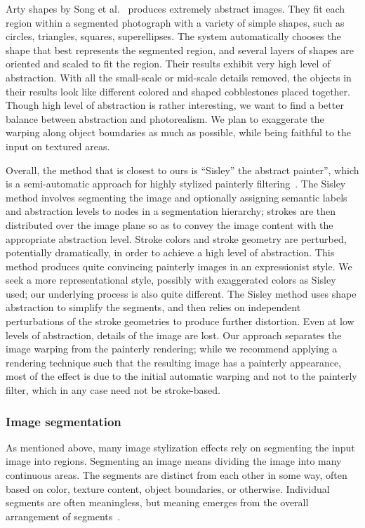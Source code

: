 Arty shapes by Song et al.~\cite{artyshapes} produces extremely abstract images. They fit each region within a segmented photograph with a variety of simple shapes, such as circles, triangles, squares, superellipses. The system automatically chooses the shape that best represents the segmented region, and several layers of shapes are oriented and scaled to fit the region. Their results exhibit very high level of abstraction. With all the small-scale or mid-scale details removed, the objects in their results look like different colored and shaped cobblestones placed together. Though high level of abstraction is rather interesting, we want to find a better balance between abstraction and photorealism. We plan to exaggerate the warping along object boundaries as much as possible, while being faithful to the input on textured areas. 

Overall, the method that is closest to ours is ``Sisley'' the abstract painter”, which is a semi-automatic approach for highly stylized painterly filtering~\cite{sisley}. The Sisley method involves segmenting the image and optionally assigning semantic labels and abstraction levels to nodes in a segmentation hierarchy; strokes are then distributed over the image plane so as to convey the image content with the appropriate abstraction level. Stroke colors and stroke geometry are perturbed, potentially dramatically, in order to achieve a high level of abstraction. This method produces quite convincing painterly images in an expressionist style. We seek a more representational style, possibly with exaggerated colors as Sisley used; our underlying process is also quite different. The Sisley method uses shape abstraction to simplify the segments, and then relies on independent perturbations of the stroke geometries to produce further distortion. Even at low levels of abstraction, details of the image are lost. Our approach separates the image warping from the painterly rendering; while we recommend applying a rendering technique such that the resulting image has a painterly appearance, most of the effect is due to the initial automatic warping and not to the painterly filter, which in any case need not be stroke-based.

\subsubsection{Image segmentation}

As mentioned above, many image stylization effects rely on segmenting the input image into regions. Segmenting an image means dividing the image into many continuous areas. The segments are distinct from each other in some way, often based on color, texture content, object boundaries, or otherwise. Individual segments are often meaningless, but meaning emerges from the overall arrangement of segments~\cite{NPRbook}. 

